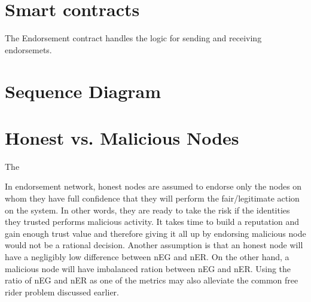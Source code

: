 %


\section{Smart contracts}
The Endorsement contract handles the logic for sending and receiving endorsemets.  



\section{Sequence Diagram}


\section{Honest vs. Malicious Nodes}
The 


In endorsement network, honest nodes are assumed to endorse only the
nodes on whom they have full confidence that they will perform the
fair/legitimate action on the system. In other words, they are ready
to take the risk if the identities they trusted performs malicious
activity. It takes time to build a reputation and gain enough trust value
and therefore giving it all up by endorsing malicious node would not
be a rational decision. Another assumption is that an honest node will
have a negligibly low difference between nEG and nER. On the other hand,
a malicious node will have imbalanced ration between nEG and nER. Using
the ratio of nEG and nER as one of the metrics may also alleviate the
common free rider problem discussed earlier.

